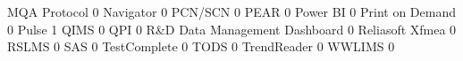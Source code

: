\documentclass{article}
\begin{document}
\begin{Schunk}
\begin{Soutput}
  MQA Protocol                                                            0
  Navigator                                                               0
  PCN/SCN                                                                 0
  PEAR                                                                    0
  Power BI                                                                0
  Print on Demand                                                         0
  Pulse                                                                   1
  QIMS                                                                    0
  QPI                                                                     0
  R&D Data Management Dashboard                                           0
  Reliasoft Xfmea                                                         0
  RSLMS                                                                   0
  SAS                                                                     0
  TestComplete                                                            0
  TODS                                                                    0
  TrendReader                                                             0
  WWLIMS                                                                  0
                                                           

\end{Soutput}
\end{Schunk}
\end{document}
